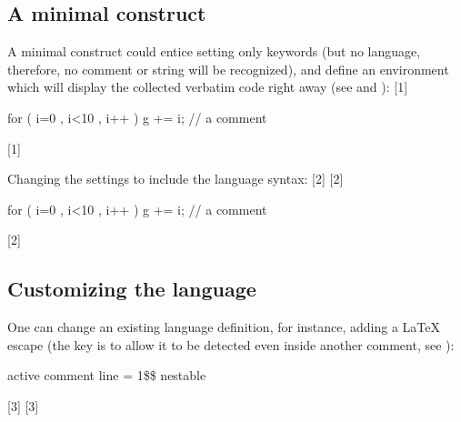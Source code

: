 \subsection{A minimal construct}
A minimal construct could entice  setting  only  keywords (but no language, therefore, no comment or string will be recognized), and define an environment which will display the collected verbatim code right away (see  and ):
[1]

\begin{codestore}[demo01]
  \begin{DemoEnv}
    for ( i=0 , i<10 , i++ ) {
      g += i;
    }
    // a comment
  \end{DemoEnv}
\end{codestore}

[1]

Changing the settings to include the language syntax:
[2]
[2]

\begin{codestore}[demo01]
  \begin{DemoEnv}
    for ( i=0 , i<10 , i++ ) {
      g += i;
    }
    // a comment 
  \end{DemoEnv}
\end{codestore}

[2]

\subsection{Customizing the language}\label{examples}
One can change an existing language definition, for instance, adding a \LaTeX{} escape (the  key is to allow it to be detected even inside another comment, see ):

\begin{codestore}[demo01]
  {
    active comment line = {1}{\$\$}{ nestable }
  }
\end{codestore}
[3]
[3]

\begin{codestore}[demo01]
\end{codestore}

